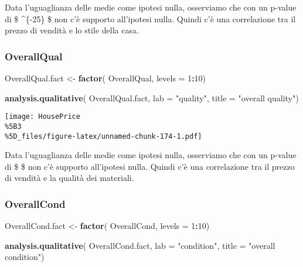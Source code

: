 \documentclass[
]{article}
\newenvironment{Shaded}{\begin{snugshade}}{\end{snugshade}}
\newcommand{\AttributeTok}[1]{\textcolor[rgb]{0.13,0.29,0.53}{#1}}
\newcommand{\DecValTok}[1]{\textcolor[rgb]{0.00,0.00,0.81}{#1}}
\newcommand{\FunctionTok}[1]{\textcolor[rgb]{0.13,0.29,0.53}{\textbf{#1}}}
\newcommand{\NormalTok}[1]{#1}
\newcommand{\OtherTok}[1]{\textcolor[rgb]{0.56,0.35,0.01}{#1}}
\newcommand{\SpecialCharTok}[1]{\textcolor[rgb]{0.81,0.36,0.00}{\textbf{#1}}}
\newcommand{\StringTok}[1]{\textcolor[rgb]{0.31,0.60,0.02}{#1}}
\begin{document}
Data l'uguaglianza delle medie come ipotesi nulla, osserviamo che con un
p-value di \$ \^{}\{-25\} \$ non c'è supporto all'ipotesi
nulla. Quindi c'è una correlazione tra il prezzo di vendità e lo stile
della casa.

\subsubsection{OverallQual}\label{overallqual-1}

\begin{Shaded}
\begin{Highlighting}[]
\NormalTok{OverallQual.fact }\OtherTok{\textless{}{-}} \FunctionTok{factor}\NormalTok{(}
\NormalTok{    OverallQual,}
    \AttributeTok{levels =} \DecValTok{1}\SpecialCharTok{:}\DecValTok{10}\NormalTok{)}

\FunctionTok{analysis.qualitative}\NormalTok{(}
\NormalTok{    OverallQual.fact,}
    \AttributeTok{lab =} \StringTok{"quality"}\NormalTok{,}
    \AttributeTok{title =} \StringTok{"overall quality"}\NormalTok{)}
\end{Highlighting}
\end{Shaded}

\texttt{[image: HousePrice\\\%5B3\\\%5D\_files/figure-latex/unnamed-chunk-174-1.pdf]}

Data l'uguaglianza delle medie come ipotesi nulla, osserviamo che con un
p-value di \$  \$ non c'è supporto all'ipotesi nulla. Quindi
c'è una correlazione tra il prezzo di vendità e la qualità dei
materiali.

\subsubsection{OverallCond}\label{overallcond-1}

\begin{Shaded}
\begin{Highlighting}[]
\NormalTok{OverallCond.fact }\OtherTok{\textless{}{-}} \FunctionTok{factor}\NormalTok{(}
\NormalTok{    OverallCond,}
    \AttributeTok{levels =} \DecValTok{1}\SpecialCharTok{:}\DecValTok{10}\NormalTok{)}

\FunctionTok{analysis.qualitative}\NormalTok{(}
\NormalTok{    OverallCond.fact,}
    \AttributeTok{lab =} \StringTok{"condition"}\NormalTok{,}
    \AttributeTok{title =} \StringTok{"overall condition"}\NormalTok{)}
\end{Highlighting}
\end{Shaded}
\end{document}
